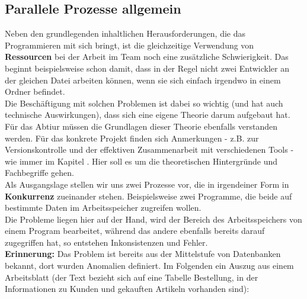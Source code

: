 \documentclass{article}
\begin{document}
\subsection{Parallele Prozesse allgemein}

Neben den grundlegenden inhaltlichen Herausforderungen, die das Programmieren mit sich bringt, ist die gleichzeitige Verwendung von \textbf{Ressourcen} bei der Arbeit im Team noch eine zusätzliche Schwierigkeit. Das beginnt beispielsweise schon damit, dass in der Regel nicht zwei Entwickler an der gleichen Datei arbeiten können, wenn sie sich einfach irgendwo in einem Ordner befindet. \\
Die Beschäftigung mit solchen Problemen ist dabei so wichtig (und hat auch technische Auswirkungen), dass sich eine eigene Theorie darum aufgebaut hat. Für das Abtiur müssen die Grundlagen dieser Theorie ebenfalls verstanden werden. Für das konkrete Projekt finden sich Anmerkungen - z.B. zur Versionskontrolle und der effektiven Zusammenarbeit mit verschiedenen Tools - wie immer im Kapitel . Hier soll es um die theoretischen Hintergründe und Fachbegriffe gehen. \\
Als Ausgangslage stellen wir uns zwei Prozesse vor, die in irgendeiner Form in \textbf{Konkurrenz} zueinander stehen. Beispielsweise zwei Programme, die beide auf bestimmte Daten im Arbeitsspeicher zugreifen wollen. \\
Die Probleme liegen hier auf der Hand, wird der Bereich des Arbeitsspeichers von einem Program bearbeitet, während das andere ebenfalls bereits darauf zugegriffen hat, so entstehen Inkonsistenzen und Fehler. \\
\textbf{Erinnerung:} Das Problem ist bereits aus der Mittelstufe von Datenbanken bekannt, dort wurden Anomalien definiert. Im Folgenden ein Auszug aus einem Arbeitsblatt (der Text bezieht sich auf eine Tabelle Bestellung, in der Informationen zu Kunden und gekauften Artikeln vorhanden sind): \\
\end{document}
